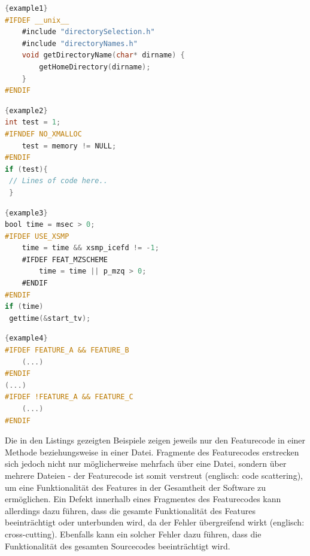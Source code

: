 \noindent\begin{minipage}{.45\textwidth}
\begin{lstlisting}[caption=Beispieleinsatz von \texttt{\#IFDEF} nach \cite{Preschern2019},frame=tlrb,language=C, label=example1]{example1}
#IFDEF __unix__
	#include "directorySelection.h"
	#include "directoryNames.h"
	void getDirectoryName(char* dirname) {
		getHomeDirectory(dirname);
	}
#ENDIF
\end{lstlisting}
\end{minipage}\hfill
\begin{minipage}{.45\textwidth}
\begin{lstlisting}[caption=Beispieleinsatz von \texttt{\#IFNDEF} nach \cite{Medeiros2018},frame=tlrb,language=C, label=example2]{example2}
int test = 1;
#IFNDEF NO_XMALLOC
	test = memory != NULL;
#ENDIF
if (test){
 // Lines of code here..
 } 
\end{lstlisting}
\end{minipage}

\noindent\begin{minipage}{.45\textwidth}
\begin{lstlisting}[caption=Beispiel eines verschachtelten Einsatzes von \texttt{\#IFDEF} nach \cite{Medeiros2018} ,frame=tlrb,language=C, label=example3, firstnumber=1]{example3}
bool time = msec > 0;
#IFDEF USE_XSMP
	time = time && xsmp_icefd != -1;
	#IFDEF FEAT_MZSCHEME
 		time = time || p_mzq > 0;
	#ENDIF
#ENDIF
if (time)
 gettime(&start_tv);
\end{lstlisting}
\end{minipage}\hfill
\begin{minipage}{.45\textwidth}
\begin{lstlisting}[caption=Beispiele von erweiterten Bedingungen nach \cite{Queiroz2015},frame=tlrb,language=C, label=example4, firstnumber=1]{example4}
#IFDEF FEATURE_A && FEATURE_B
	(...)
#ENDIF
(...)
#IFDEF !FEATURE_A && FEATURE_C
	(...)
#ENDIF
\end{lstlisting}
\end{minipage}

Die in den Listings gezeigten Beispiele zeigen jeweils nur den Featurecode in einer Methode beziehungsweise in einer Datei. Fragmente des Featurecodes erstrecken sich jedoch nicht nur möglicherweise mehrfach über eine Datei, sondern über mehrere Dateien - der Featurecode ist somit verstreut (englisch: code scattering), um eine Funktionalität des Features in der Gesamtheit der Software zu ermöglichen. Ein Defekt innerhalb eines Fragmentes des Featurecodes kann allerdings dazu führen, dass die gesamte Funktionalität des Features beeinträchtigt oder unterbunden wird, da der Fehler übergreifend wirkt (englisch: cross-cutting). Ebenfalls kann ein solcher Fehler dazu führen, dass die Funktionalität des gesamten Sourcecodes beeinträchtigt wird.

